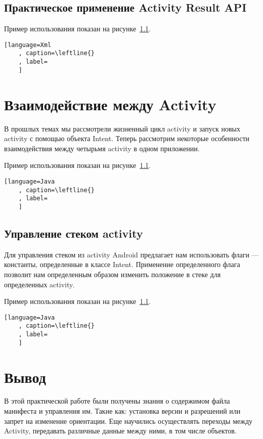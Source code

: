 \subsection{Практическое применение Activity Result API}
Пример использования показан на рисунке~\ref{}.

\begin{lstlisting}[language=Xml
	, caption=\leftline{}
	, label=
	]
\end{lstlisting}

\section{Взаимодействие между Activity}
В прошлых темах мы рассмотрели жизненный цикл activity и запуск новых
activity с помощью объекта Intent. Теперь рассмотрим некоторые
особенности взаимодействия между четырьмя activity в одном приложении.\par
Пример использования показан на рисунке~\ref{}.

\begin{lstlisting}[language=Java
	, caption=\leftline{}
	, label=
	]
\end{lstlisting}

\subsection{Управление стеком activity}
Для управления стеком из activity Android предлагает нам использовать
флаги --- константы, определенные в классе Intent. Применение
определенного флага позволит нам определенным образом изменить
положение в стеке для определенных activity.\par
Пример использования показан на рисунке~\ref{}.

\begin{lstlisting}[language=Java
	, caption=\leftline{}
	, label=
	]
\end{lstlisting}

\clearpage

\section*{\LARGE{Вывод}}
В этой практической работе были получены знания о содержимом файла
манифеста и управления им. Такие как: установка версии и разрешений или
запрет на изменение ориентации. Еще научились осуществлять переходы
между Activity, передавать различные данные между ними, в том числе
объектов.


